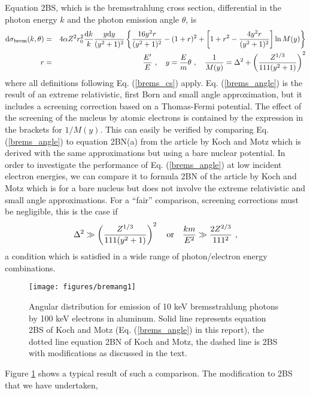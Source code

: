 Equation 2BS, which is the bremsstrahlung cross section,
differential in the photon energy
$k$ and the photon emission angle $\theta$, is \cite{KM59}
\begin{eqnarray}
\label{brems_angle}
{\rm d}\sigma_{\rm brem}(k,\theta) & = & 4 \alpha Z^2 r_0^2 \frac{{\rm d}k}{k}
{y {\rm d} y \over (y^2 + 1)^2}
\left\{ {16 y^2 r \over (y^2 + 1)^2} - (1+r)^2 + \left[
1 + r^2 - {4 y^2 r \over (y^2 + 1)^2} \right] \ln M(y) \right\}
\nonumber \\
r & = & \frac{E'}{E}~, \quad y = \frac{E}{m} \theta~, \quad \frac{1}{M(y)} =
\Delta^2 + \left( {Z^{1/3} \over 111 (y^2 + 1)} \right)^2
\end{eqnarray}
where all definitions following Eq. (\ref{brems_cs}) apply.
Eq. (\ref{brems_angle}) is the result of an extreme relativistic,
first Born and small angle approximation, but it includes a
screening correction
based on a Thomas-Fermi potential. The effect of the screening
of the nucleus by atomic electrons is contained by the
expression in the brackets for $1/M(y)$. This can easily be
verified by comparing Eq. (\ref{brems_angle}) to equation
2BN(a) from the article by Koch and Motz which is derived
with the same approximations but using a bare nuclear potential.
In order to investigate the performance of
Eq. (\ref{brems_angle}) at low incident electron energies,
we can compare it to formula
2BN of the article by Koch and Motz which is for a bare
nucleus but does not involve the extreme relativistic
and small angle
approximations. For a ``fair'' comparison, screening corrections
must be negligible, this is the case if
\begin{equation}
\Delta^2 \gg \left( {Z^{1/3} \over 111 (y^2 + 1)} \right)^2 \quad
\mbox{or} \quad {k m \over E^2} \gg {2 Z^{2/3} \over 111^2}~,
\end{equation}
a condition which is satisfied in a wide range of photon/electron
energy combinations.
\begin{figure}[htp]
\texttt{[image: figures/bremang1]}
\caption[Low energy bremsstrahlung angular distribution]{\label{brems_angle_fig1}
Angular distribution for emission of 10 keV bremsstrahlung photons
by 100 keV electrons in aluminum. Solid line represents
equation 2BS of Koch and Motz (Eq. (\ref{brems_angle}) in this
report), the dotted line equation 2BN of Koch and Motz, the
dashed line is 2BS with modifications as discussed in the text.}
\end{figure}
Figure \ref{brems_angle_fig1} shows a typical result of such
a comparison. The modification to 2BS that we have undertaken,
